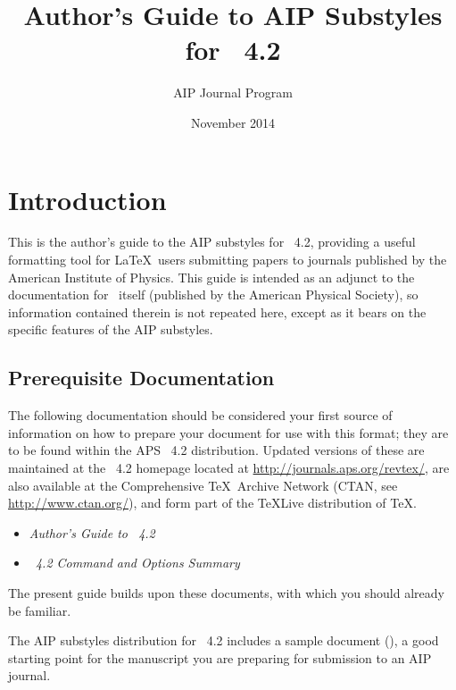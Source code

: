 \documentclass[%
 reprint,%
 amssymb, amsmath,%
 aip,cha,%
]{revtex4-2}
\begin{document}
\title{Author's Guide to AIP Substyles for \revtex~4.2}%

\author{AIP Journal Program}%
%

\date{November 2014}%
%

\maketitle

\tableofcontents

\section{Introduction}

This is the author's guide to the AIP substyles for \revtex~4.2, 
providing a useful formatting tool 
for \LaTeX\ users submitting papers to journals 
published by the American Institute of Physics.
This guide is intended as an adjunct to the documentation for \revtex\ itself 
(published by the American Physical Society), 
so information contained therein is not repeated here, 
except as it bears on the specific features of the AIP substyles.


\subsection{Prerequisite Documentation}

The following documentation should be considered your first source of information 
on how to prepare your document for use with this format; 
they are to be found within the APS \revtex~4.2 distribution. 
Updated versions of these are maintained at
the \revtex~4.2 homepage located at \url{http://journals.aps.org/revtex/},
are also available at the Comprehensive \TeX\ Archive Network (CTAN, see \url{http://www.ctan.org/}), 
and form part of the \TeX Live distribution of \TeX.
\begin{itemize}
\item \textit{Author's Guide to \revtex~4.2}
\item \textit{\revtex~4.2 Command and Options Summary}
\end{itemize}
The present guide builds upon these documents, with which you should already be familiar.

The AIP substyles distribution for \revtex~4.2 includes 
a sample document (), 
a good starting point for 
the manuscript you are preparing for submission to an AIP journal.
\end{document}

